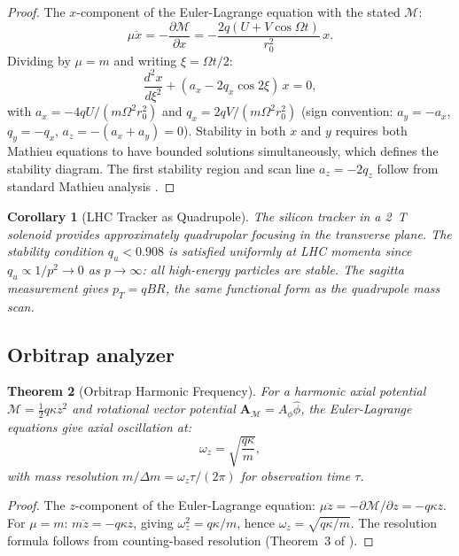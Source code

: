 \documentclass[twocolumn,10pt,a4paper]{article}
\theoremstyle{thmstyle}
\newtheorem{theorem}{Theorem}[section]
\newtheorem{corollary}[theorem]{Corollary}
\theoremstyle{definition}
\theoremstyle{remark}
\newcommand{\AM}{\mathbf{A}_{\mathcal{M}}}
\newcommand{\Mop}{\mathcal{M}}
\begin{document}
\begin{proof}
The $x$-component of the Euler-Lagrange equation with the stated $\Mop$:
\[
\mu\ddot{x} = -\frac{\partial\Mop}{\partial x}
= -\frac{2q(U + V\cos\Omega t)}{r_0^2}\,x.
\]
Dividing by $\mu = m$ and writing $\xi = \Omega t/2$:
\[
\frac{d^2x}{d\xi^2} + (a_x - 2q_x\cos 2\xi)\,x = 0,
\]
with $a_x = -4qU/(m\Omega^2 r_0^2)$ and $q_x = 2qV/(m\Omega^2 r_0^2)$
(sign convention: $a_y = -a_x$, $q_y = -q_x$, $a_z = -(a_x+a_y) = 0$).
Stability in both $x$ and $y$ requires both Mathieu equations to have
bounded solutions simultaneously, which defines the stability diagram.
The first stability region and scan line $a_z = -2q_z$ follow from standard
Mathieu analysis \citep{paul1990}.
\end{proof}

\begin{corollary}[LHC Tracker as Quadrupole]
The silicon tracker in a 2~T solenoid provides approximately
quadrupolar focusing in the transverse plane. The stability condition
$q_u < 0.908$ is satisfied uniformly at LHC momenta since
$q_u \propto 1/p^2 \to 0$ as $p \to \infty$: all high-energy particles
are stable. The sagitta measurement gives $p_T = qBR$, the same functional
form as the quadrupole mass scan.
\end{corollary}

\subsection{Orbitrap analyzer}

\begin{theorem}[Orbitrap Harmonic Frequency]
\label{thm:orbitrap}
For a harmonic axial potential $\Mop = \tfrac{1}{2}q\kappa z^2$
and rotational vector potential $\AM = A_\phi\hat\phi$, the
Euler-Lagrange equations give axial oscillation at:
\begin{equation}
\omega_z = \sqrt{\frac{q\kappa}{m}},
\label{eq:orbitrap}
\end{equation}
with mass resolution $m/\Delta m = \omega_z\tau/(2\pi)$ for
observation time $\tau$.
\end{theorem}

\begin{proof}
The $z$-component of the Euler-Lagrange equation:
$\mu\ddot{z} = -\partial\Mop/\partial z = -q\kappa z$.
For $\mu = m$: $m\ddot{z} = -q\kappa z$, giving
$\omega_z^2 = q\kappa/m$, hence $\omega_z = \sqrt{q\kappa/m}$.
The resolution formula follows from counting-based resolution
(Theorem~3 of \citealt{companion:qnd}).
\end{proof}
\end{document}
